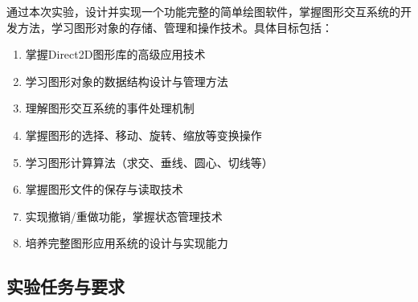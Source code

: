 \documentclass[12pt,a4paper]{article}
\begin{document}
\begin{tcolorbox}
通过本次实验，设计并实现一个功能完整的简单绘图软件，掌握图形交互系统的开发方法，学习图形对象的存储、管理和操作技术。具体目标包括：

\begin{enumerate}
    \item 掌握Direct2D图形库的高级应用技术
    \item 学习图形对象的数据结构设计与管理方法
    \item 理解图形交互系统的事件处理机制
    \item 掌握图形的选择、移动、旋转、缩放等变换操作
    \item 学习图形计算算法（求交、垂线、圆心、切线等）
    \item 掌握图形文件的保存与读取技术
    \item 实现撤销/重做功能，掌握状态管理技术
    \item 培养完整图形应用系统的设计与实现能力
\end{enumerate}
\end{tcolorbox}

\subsection{实验任务与要求}
\end{document}
